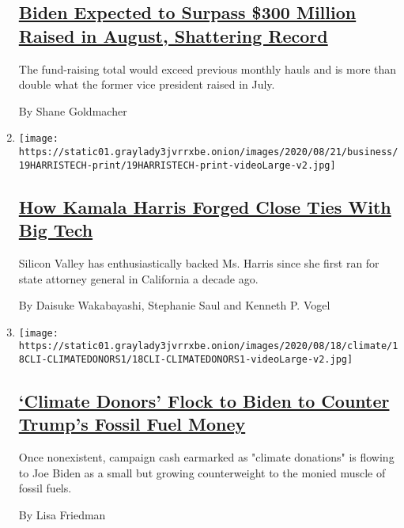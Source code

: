 \begin{enumerate}
  \hypertarget{biden-expected-to-surpass-300-million-raised-in-august-shattering-record}{%
  \subsection{\texorpdfstring{\href{/2020/09/01/us/politics/biden-trump-fundraising-election.html}{Biden
  Expected to Surpass \$300 Million Raised in August, Shattering
  Record}}{Biden Expected to Surpass \$300 Million Raised in August, Shattering Record}}\label{biden-expected-to-surpass-300-million-raised-in-august-shattering-record}}

  The fund-raising total would exceed previous monthly hauls and is more
  than double what the former vice president raised in July.

  By Shane Goldmacher
\item
  \texttt{[image: https://static01.graylady3jvrrxbe.onion/images/2020/08/21/business/19HARRISTECH-print/19HARRISTECH-print-videoLarge-v2.jpg]}

  \hypertarget{how-kamala-harris-forged-close-ties-with-big-tech}{%
  \subsection{\texorpdfstring{\href{/2020/08/20/technology/kamala-harris-ties-to-big-tech.html}{How
  Kamala Harris Forged Close Ties With Big
  Tech}}{How Kamala Harris Forged Close Ties With Big Tech}}\label{how-kamala-harris-forged-close-ties-with-big-tech}}

  Silicon Valley has enthusiastically backed Ms. Harris since she first
  ran for state attorney general in California a decade ago.

  By Daisuke Wakabayashi, Stephanie Saul and Kenneth P. Vogel
\item
  \texttt{[image: https://static01.graylady3jvrrxbe.onion/images/2020/08/18/climate/18CLI-CLIMATEDONORS1/18CLI-CLIMATEDONORS1-videoLarge-v2.jpg]}

  \hypertarget{climate-donors-flock-to-biden-to-counter-trumps-fossil-fuel-money}{%
  \subsection{\texorpdfstring{\href{/2020/08/18/climate/climate-change-biden.html}{`Climate
  Donors' Flock to Biden to Counter Trump's Fossil Fuel
  Money}}{`Climate Donors' Flock to Biden to Counter Trump's Fossil Fuel Money}}\label{climate-donors-flock-to-biden-to-counter-trumps-fossil-fuel-money}}

  Once nonexistent, campaign cash earmarked as "climate donations" is
  flowing to Joe Biden as a small but growing counterweight to the
  monied muscle of fossil fuels.

  By Lisa Friedman
\end{enumerate}

